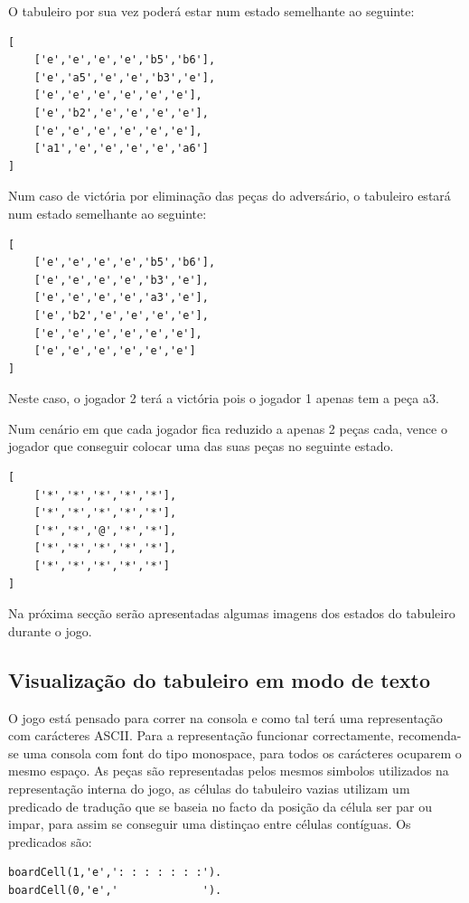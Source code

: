 \documentclass[paper=a4, fontsize=11pt]{scrartcl} %
\numberwithin{equation}{section} %
\numberwithin{figure}{section} %
\numberwithin{table}{section} %
\begin{document}
O tabuleiro por sua vez poderá estar num estado semelhante ao seguinte:

\begin{lstlisting}
[
	['e','e','e','e','b5','b6'],
	['e','a5','e','e','b3','e'],
	['e','e','e','e','e','e'],
	['e','b2','e','e','e','e'],
	['e','e','e','e','e','e'],
	['a1','e','e','e','e','a6']
]
\end{lstlisting}

Num caso de victória por eliminação das peças do adversário, o tabuleiro estará num estado semelhante ao seguinte:

\begin{lstlisting}
[
	['e','e','e','e','b5','b6'],
	['e','e','e','e','b3','e'],
	['e','e','e','e','a3','e'],
	['e','b2','e','e','e','e'],
	['e','e','e','e','e','e'],
	['e','e','e','e','e','e']
]
\end{lstlisting}

Neste caso, o jogador 2 terá a victória pois o jogador 1 apenas tem a peça a3.

Num cenário em que cada jogador fica reduzido a apenas 2 peças cada, vence o jogador que conseguir colocar uma das suas peças no seguinte estado.

\begin{lstlisting}
[
	['*','*','*','*','*'],
	['*','*','*','*','*'],
	['*','*','@','*','*'],
	['*','*','*','*','*'],
	['*','*','*','*','*']
]
\end{lstlisting}


Na próxima secção serão apresentadas algumas imagens dos estados do tabuleiro durante o jogo.

\subsection{Visualização do tabuleiro em modo de texto}

O jogo está pensado para correr na consola e como tal terá uma representação com carácteres ASCII. Para a representação funcionar correctamente, recomenda-se uma consola com font do tipo monospace, para todos os carácteres ocuparem o mesmo espaço. As peças são representadas pelos mesmos simbolos utilizados na representação interna do jogo, as células do tabuleiro vazias utilizam um predicado de tradução que se baseia no facto da posição da célula ser par ou impar, para assim se conseguir uma distinçao entre células contíguas. Os predicados são:

\begin{lstlisting}
boardCell(1,'e',': : : : : : :').
boardCell(0,'e','             ').
\end{lstlisting}
\end{document}

